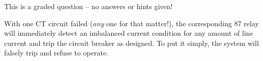 
This is a graded question -- no answers or hints given!







With one CT circuit failed ({\it any} one for that matter!), the corresponding 87 relay will immediately detect an imbalanced current condition for any amount of line current and trip the circuit breaker as designed.  To put it simply, the system will falsely trip and refuse to operate.





